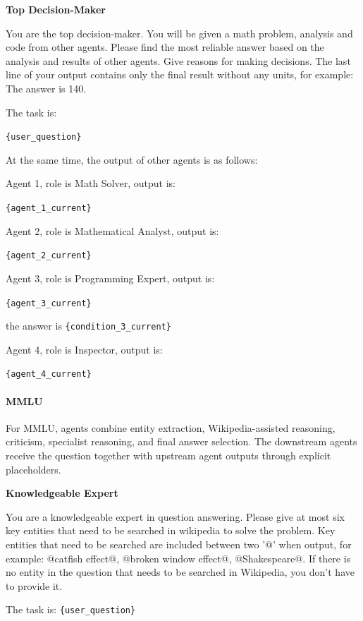 \documentclass[letterpaper]{article} %
\newcommand{\placeholder}[1]{\texttt{\{#1\}}}
\newenvironment{promptbox}[1]{%
  \par\smallskip\noindent
  \textbf{#1}\par\noindent
  \setlength{\fboxsep}{6pt}%
  \setlength{\fboxrule}{0.7pt}%
  \cornersize{0.08}%
  \begin{lrbox}{\promptboxcontent}%
  \begin{minipage}{0.92\columnwidth}\small\raggedright
}{%
  \end{minipage}%
  \end{lrbox}%
  \ovalbox{\usebox{\promptboxcontent}}\par\smallskip
}
\begin{document}
\begin{promptbox}{Top Decision-Maker}
	You are the top decision-maker. You will be given a math problem, analysis and code from other agents. Please find the most reliable answer based on the analysis and results of other agents. Give reasons for making decisions. The last line of your output contains only the final result without any units, for example: The answer is 140.
	
	The task is:
	
	\placeholder{user\_question}
	
	At the same time, the output of other agents is as follows:
	
	Agent 1, role is Math Solver, output is:
	
	\placeholder{agent\_1\_current}
	
	Agent 2, role is Mathematical Analyst, output is:
	
	\placeholder{agent\_2\_current}
	
	Agent 3, role is Programming Expert, output is:
	
	\placeholder{agent\_3\_current}
	
	the answer is \placeholder{condition\_3\_current}
	
	Agent 4, role is Inspector, output is:
	
	\placeholder{agent\_4\_current}
\end{promptbox}

\paragraph{MMLU}

For MMLU, agents combine entity extraction, Wikipedia-assisted reasoning, criticism, specialist reasoning, and final answer selection. The downstream agents receive the question together with upstream agent outputs through explicit placeholders.

\begin{promptbox}{Knowledgeable Expert}
	You are a knowledgeable expert in question answering.
	Please give at most six key entities that need to be searched in wikipedia to solve the problem.
	Key entities that need to be searched are included between two '@' when output, for example: @catfish effect@, @broken window effect@, @Shakespeare@.
	If there is no entity in the question that needs to be searched in Wikipedia, you don't have to provide it.
	
	The task is: \placeholder{user\_question}
\end{promptbox}
\end{document}
